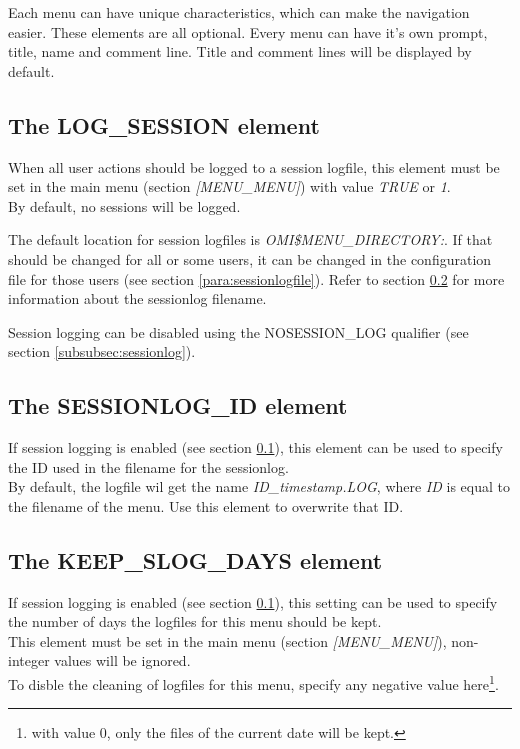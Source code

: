 \documentclass[a4paper]{book}
\newcommand{\vs}{\vspace{3mm}}
\begin{document}
Each menu can have unique characteristics, which can make the navigation 
easier. These elements are all optional. Every menu can have it's own 
prompt, title, name and comment line. Title and comment lines will be 
displayed by default.

\subsection{The LOG{\_}SESSION element}\label{subsec:logsession}

When all user actions should be logged to a session logfile, this element must be set in the main menu (section \textsl{[MENU{\_}MENU]}) with value \textsl{TRUE} or \textsl{1}.\\
By default, no sessions will be logged.

\vs

The default location for session logfiles is \textsl{OMI{\$}MENU{\_}DIRECTORY:}. If that should be changed for all or some users, it can be changed in the configuration file for those users (see section \ref{para:sessionlogfile}). Refer to section \ref{subsec:sessionlogid} for more information about the sessionlog filename.

\vs

Session logging can be disabled using the \textsf{NOSESSION{\_}LOG} qualifier (see section \ref{subsubsec:sessionlog}).

\subsection{The SESSIONLOG{\_}ID element}\label{subsec:sessionlogid}

If session logging is enabled (see section \ref{subsec:logsession}), this element can be used to specify the ID used in the filename for the sessionlog.\\
By default, the logfile wil get the name \textsl{\textit{ID}{\_}\textit{timestamp}.LOG}, where \textsl{\textit{ID}} is equal to the filename of the menu. Use this element to overwrite that ID.

\subsection{The KEEP{\_}SLOG{\_}DAYS element}\label{subsec:cleansessionlog}

If session logging is enabled (see section \ref{subsec:logsession}), this setting can be used to specify the number of days the logfiles for this menu should be kept.\\
This element must be set in the main menu (section \textsl{[MENU{\_}MENU]}), non-integer values will be ignored.\\
To disble the cleaning of  logfiles for this menu, specify any negative value here\footnote{ with value 0, only the files of the current date will be kept.}.
\end{document}

